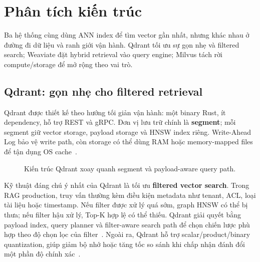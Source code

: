 \section{Phân tích kiến trúc}
\label{sec:architecture}

Ba hệ thống cùng dùng ANN index để tìm vector gần nhất, nhưng khác nhau ở đường đi dữ liệu và ranh giới vận hành. Qdrant tối ưu sự gọn nhẹ và filtered search; Weaviate đặt hybrid retrieval vào query engine; Milvus tách rời compute/storage để mở rộng theo vai trò.

\subsection{Qdrant: gọn nhẹ cho filtered retrieval}
\label{sec:qdrant}

Qdrant được thiết kế theo hướng tối giản vận hành: một binary Rust, ít dependency, hỗ trợ REST và gRPC. Đơn vị lưu trữ chính là \textbf{segment}; mỗi segment giữ vector storage, payload storage và HNSW index riêng. Write-Ahead Log bảo vệ write path, còn storage có thể dùng RAM hoặc memory-mapped files để tận dụng OS cache~\cite{qdrantdocs,qdrantstorage}.

\begin{figure}[H]
\centering
{}
\caption{Kiến trúc Qdrant xoay quanh segment và payload-aware query path.}
\label{fig:qdrant-arch}
\end{figure}

Kỹ thuật đáng chú ý nhất của Qdrant là tối ưu \textbf{filtered vector search}. Trong RAG production, truy vấn thường kèm điều kiện metadata như tenant, ACL, loại tài liệu hoặc timestamp. Nếu filter được xử lý quá sớm, graph HNSW có thể bị thưa; nếu filter hậu xử lý, Top-K hợp lệ có thể thiếu. Qdrant giải quyết bằng payload index, query planner và filter-aware search path để chọn chiến lược phù hợp theo độ chọn lọc của filter~\cite{qdrantfilter}. Ngoài ra, Qdrant hỗ trợ scalar/product/binary quantization, giúp giảm bộ nhớ hoặc tăng tốc so sánh khi chấp nhận đánh đổi một phần độ chính xác~\cite{jegou2011pq}.

